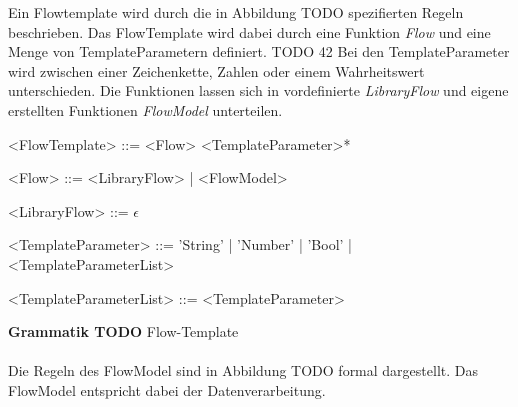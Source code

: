 \documentclass{article}
\begin{document}
    Ein Flowtemplate wird durch die in Abbildung TODO spezifierten Regeln beschrieben.
    Das FlowTemplate wird dabei durch eine Funktion \textit{Flow} und eine Menge von TemplateParametern definiert. TODO 42
    Bei den TemplateParameter wird zwischen einer Zeichenkette, Zahlen oder einem Wahrheitswert unterschieden.
    Die Funktionen lassen sich in vordefinierte \textit{LibraryFlow} und eigene erstellten Funktionen \textit{FlowModel} unterteilen. 
    \begin{grammar}
        <FlowTemplate> ::= <Flow> <TemplateParameter>*

        <Flow> ::= <LibraryFlow> | <FlowModel>
        
        <LibraryFlow> ::= $\epsilon$

        <TemplateParameter> ::= 'String' | 'Number' | 'Bool' | <TemplateParameterList>
        
        <TemplateParameterList> ::= <TemplateParameter>
    \end{grammar}
    \textbf{Grammatik TODO} Flow-Template\\\\
    Die Regeln des FlowModel sind in Abbildung TODO formal dargestellt. Das FlowModel entspricht dabei der Datenverarbeitung. \cite{99}
\end{document}
